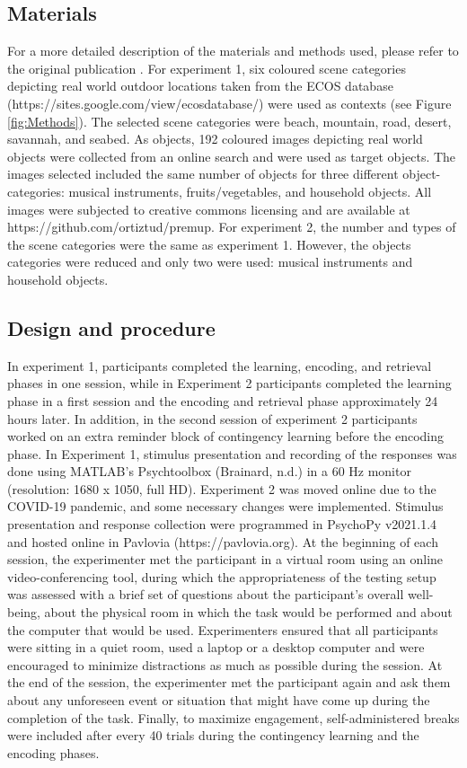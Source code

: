 \documentclass[a4paper,12pt]{article}
\begin{document}
\subsection{Materials}
For a more detailed description of the materials and methods used, please refer to the original publication \citep{ortiz2021not}. For experiment 1, six coloured scene categories depicting real world outdoor locations taken from the ECOS database (https://sites.google.com/view/ecosdatabase/) were used as contexts (see Figure \ref{fig:Methods}). The selected scene categories were beach, mountain, road, desert, savannah, and seabed. As objects, 192 coloured images depicting real world objects were collected from an online search and were used as target objects. The images selected included the same number of objects for three different object-categories: musical instruments, fruits/vegetables, and household objects. All images were subjected to creative commons licensing and are available at https://github.com/ortiztud/premup. 
For experiment 2, the number and types of the scene categories were the same as experiment 1. However, the objects categories were reduced and only two were used: musical instruments and household objects. 
\subsection{Design and procedure}
In experiment 1, participants completed the learning, encoding, and retrieval phases in one session, while in Experiment 2 participants completed the learning phase in a first session and the encoding and retrieval phase approximately 24 hours later. In addition, in the second session of experiment 2 participants worked on an extra reminder block of contingency learning before the encoding phase. 
In Experiment 1, stimulus presentation and recording of the responses was done using MATLAB’s Psychtoolbox (Brainard, n.d.) in a 60 Hz monitor (resolution: 1680 x 1050, full HD). 
 Experiment 2 was moved online due to the COVID-19 pandemic, and some necessary changes were implemented. Stimulus presentation and response collection were programmed in PsychoPy v2021.1.4 and hosted online in Pavlovia (https://pavlovia.org). At the beginning of each session, the experimenter met the participant in a virtual room using an online video-conferencing tool, during which the appropriateness of the testing setup was assessed with a brief set of questions about the participant’s overall well-being, about the physical room in which the task would be performed and about the computer that would be used. Experimenters ensured that all participants were sitting in a quiet room, used a laptop or a desktop computer and were encouraged to minimize distractions as much as possible during the session. At the end of the session, the experimenter met the participant again and ask them about any unforeseen event or situation that might have come up during the completion of the task. Finally, to maximize engagement, self-administered breaks were included after every 40 trials during the contingency learning and the encoding phases. 
\end{document}
